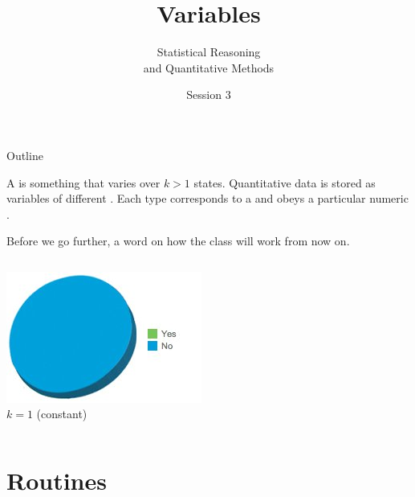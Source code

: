 \documentclass{beamer}
\author{Statistical Reasoning\\and Quantitative Methods}
\title{Variables}
\institute{François Briatte \& Ivaylo Petev}
\date{Session 3}
\begin{document}
		
	\begin{frame}[t,plain]
		\titlepage
	\end{frame}
	
	\begin{frame}[t]{Outline}
	
	A  is something that varies over $k > 1$ states. Quantitative data is stored as variables of different . Each type corresponds to a  and obeys a particular numeric .\vspace{1em}
	
	Before we go further, a word on how the class will work from now on.
	
		\begin{columns}[T]
			\tableofcontents[hideallsubsections]
			\begin{center}
				\includegraphics[scale=.5]{images/pie-no.jpg}\\[.5em]
				$k=1$ (constant)
			\end{center}		
		\end{columns}
	\end{frame}


	\section{Routines}
\end{document}
